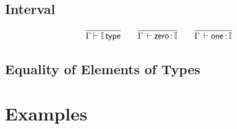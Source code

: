 \documentclass[11pt]{article}
\theoremstyle{plain}
\begin{document}
\subsection{Interval}

\[
\begin{array}{c}
\infer{\wftp{\Gamma}{\I}}
      {}
\qquad
\infer{\oftp{\Gamma}{\Iz}{\I}}{}
\qquad
\infer{\oftp{\Gamma}{\Io}{\I}}{}
\end{array}
\]


\subsection{Equality of Elements of Types}



\section{Examples}
\end{document}
